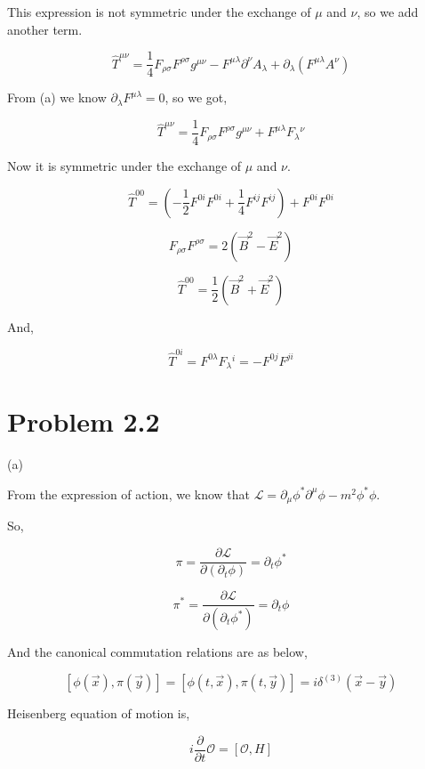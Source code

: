 \documentclass[11pt]{article} %
\begin{document}
This expression is not symmetric under the exchange of $\mu$ and $\nu$, so we add another term.

\[
    \hat{T}^{\mu \nu} = \frac{1}{4}\mathit{F}_{\rho \sigma} \mathit{F}^{\rho \sigma} g^{\mu \nu} - \mathit{F}^{\mu \lambda} \partial^{\nu} A_{\lambda} + \partial_{\lambda} (\mathit{F}^{\mu \lambda} A^{\nu})   
\]

From (a) we know $\partial_{\lambda} \mathit{F}^{\mu \lambda} = 0$, so we got,

\[
    \hat{T}^{\mu \nu} = \frac{1}{4}\mathit{F}_{\rho \sigma} \mathit{F}^{\rho \sigma} g^{\mu \nu} + \mathit{F}^{\mu \lambda} \mathit{F}_{\lambda}{ }^{\nu}
\]

Now it is symmetric under the exchange of $\mu$ and $\nu$.

\[
    \hat{T}^{00} = \left(-\frac{1}{2} F^{0 i} F^{0 i}+\frac{1}{4} F^{i j} F^{i j}\right)+F^{0 i} F^{0 i}    
\]

\[
    \mathit{F}_{\rho \sigma} \mathit{F}^{\rho \sigma} = 2(\vec{B}^2 - \vec{E}^2)  
\]

\[
    \hat{T}^{00} = \frac{1}{2}(\vec{B}^2 + \vec{E}^2) 
\]

And, 

\[
    \hat{T}^{0i} = \mathit{F}^{0 \lambda} \mathit{F}_{\lambda}{ }^{i} = - \mathit{F}^{0 j} \mathit{F}^{ji}
\]


\section{Problem 2.2}

\noindent (a)

From the expression of action, we know that $\mathcal{L} = \partial_{\mu} \phi^* \partial^{\mu} \phi - m^2 \phi^* \phi$.

So,

\[
    \pi = \frac{\partial \mathcal{L}}{\partial(\partial_t \phi)} = \partial_t \phi^*    
\]

\[
    \pi^* = \frac{\partial \mathcal{L}}{\partial(\partial_t \phi^*)} = \partial_t \phi    
\]

And the canonical commutation relations are as below,

\[
    [\phi(\vec{x}), \pi(\vec{y})] = [\phi(t, \vec{x}), \pi(t, \vec{y})] = i \delta^{(3)} (\vec{x}-\vec{y})    
\]

Heisenberg equation of motion is,

\[
    i \frac{\partial}{\partial t} \mathcal{O} = [\mathcal{O}, H]    
\]
\end{document}
